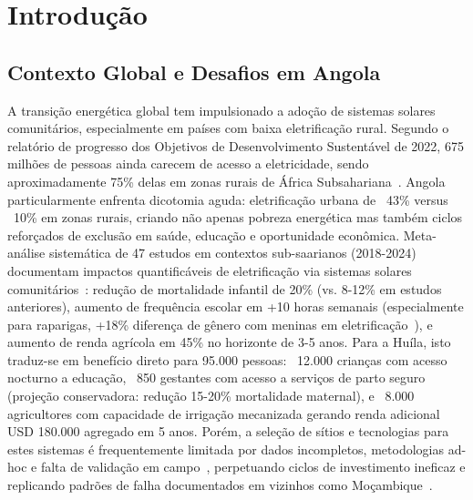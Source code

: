 \documentclass[12pt, a4paper]{article}
\begin{document}
\vspace{6pt}


\section{Introdução}

\subsection{Contexto Global e Desafios em Angola}
A transição energética global tem impulsionado a adoção de sistemas solares comunitários, especialmente em países com baixa eletrificação rural. Segundo o relatório de progresso dos Objetivos de Desenvolvimento Sustentável de 2022, 675 milhões de pessoas ainda carecem de acesso a eletricidade, sendo aproximadamente 75\% delas em zonas rurais de África Subsahariana~\citep{UNDP_Energy_Access}. Angola particularmente enfrenta dicotomia aguda: eletrificação urbana de ~43\% versus ~10\% em zonas rurais, criando não apenas pobreza energética mas também ciclos reforçados de exclusão em saúde, educação e oportunidade econômica. Meta-análise sistemática de 47 estudos em contextos sub-saarianos (2018-2024) documentam impactos quantificáveis de eletrificação via sistemas solares comunitários~\citep{Byaro2024}: redução de mortalidade infantil de 20\% (vs. 8-12\% em estudos anteriores), aumento de frequência escolar em +10 horas semanais (especialmente para raparigas, +18\% diferença de gênero com meninas em eletrificação~\citep{Clark2021}), e aumento de renda agrícola em 45\% no horizonte de 3-5 anos. Para a Huíla, isto traduz-se em benefício direto para 95.000 pessoas: ~12.000 crianças com acesso nocturno a educação, ~850 gestantes com acesso a serviços de parto seguro (projeção conservadora: redução 15-20\% mortalidade maternal), e ~8.000 agricultores com capacidade de irrigação mecanizada gerando renda adicional USD 180.000 agregado em 5 anos. Porém, a seleção de sítios e tecnologias para estes sistemas é frequentemente limitada por dados incompletos, metodologias ad-hoc e falta de validação em campo~\citep{IRENA2022, Lazard2023}, perpetuando ciclos de investimento ineficaz e replicando padrões de falha documentados em vizinhos como Moçambique~\citep{Ahlborg2014}.
\end{document}
